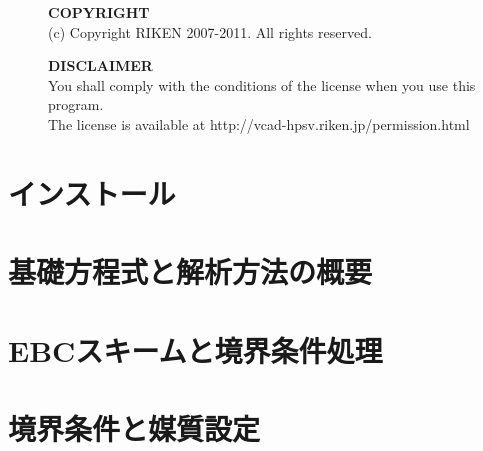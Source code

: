\documentclass[a4paper,10pt,oneside,fleqn]{jsbook}
\newcounter{program}
\begin{document}
\vspace{15cm}

\begin{description}
\item[ ] \textbf{COPYRIGHT}\\
(c) Copyright RIKEN 2007-2011. All rights reserved.\\

\item[ ] \textbf{DISCLAIMER}\\
You shall comply with the conditions of the license when you use this program.\\
The license is available at http://vcad-hpsv.riken.jp/permission.html
\end{description}
%

\tableofcontents
%
%
\mainmatter

%
\chapter{インストール}
\begin{abstract}
事前に必要なMPI通信ライブラリとV-Sphereのインストール，および基本的なCBCソルバークラスのインストールについてはV-Sphereユーザガイドを参照.
この章では，CBCソルバークラスの詳細なインストールとコンパイルについて説明する．
\end{abstract}


%
\chapter{基礎方程式と解析方法の概要}
\begin{abstract}
本章では，CBCソルバークラスが扱う流体の基礎方程式と解法アルゴリズム，離散化について概略を述べる．
\end{abstract}


%
\chapter{EBCスキームと境界条件処理}
\label{chpt:ebcs}
\begin{abstract}
この章では，直交 Euler 格子のコロケート変数配置の場合に，任意位置の境界条件を効率よく処理する方法として，スキーム中に境界条件を実装方法について述べる．
\end{abstract}


%
\chapter{境界条件と媒質設定}
\begin{abstract}
本章では，CBCソルバークラスで設定できる境界条件と媒質情報の設定について説明する．まず境界条件と媒質を指定するXMLタグの構造について述べた後，流れと熱の境界条件について説明する．\ref{chpt:ebcs}章で説明したDirichlet型とNeumann型の基本的な境界条件を用いた物理的な境界条件について述べる．また，パラメータの設定については\ref{chpt:m_medium}章で詳しく説明する．
\end{abstract}

\end{document}
